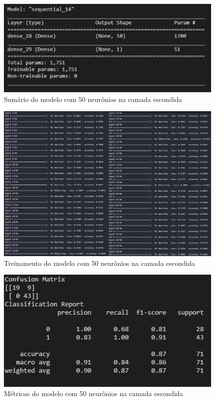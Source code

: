 \documentclass[12pt]{article}
\begin{document}
\begin{figure}[H]
	\centering
	\includegraphics[width=0.7\linewidth]{Imagens/50neuronios/sumario50neuronios}
	\caption{Sumário do modelo com 50 neurônios na camada escondida}
	\label{fig:sumario50neuronios}
\end{figure}
\begin{figure}[H]
	\centering
	\includegraphics[width=1.1\linewidth]{Imagens/50neuronios/fit50neuronios}
	\caption{Treinamento do modelo com 50 neurônios na camada escondida}
	\label{fig:fit50neuronios}
\end{figure}
\begin{figure}[H]
	\centering
	\includegraphics[width=0.7\linewidth]{Imagens/50neuronios/metricas50neuronios}
	\caption{Métricas do modelo com 50 neurônios na camada escondida}
	\label{fig:metricas50neuronios}
\end{figure}
\end{document}
